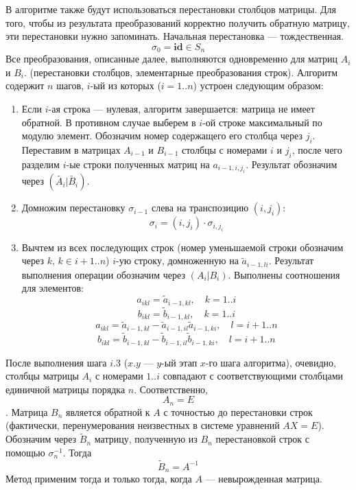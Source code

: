 \documentclass[12pt, russian]{article}
\begin{document}
В алгоритме также будут использоваться перестановки столбцов матрицы. Для того, чтобы из результата преобразований корректно получить обратную матрицу, эти перестановки нужно запоминать. Начальная перестановка --- тождественная.
$$ \sigma_0 = \textbf{id} \in S_n $$
Все преобразования, описанные далее, выполняются одновременно для матриц $A_i$ и $B_i$. (перестановки столбцов, элементарные преобразования строк).
Алгоритм содержит $n$ шагов, $i$-ый из которых ($i=1..n$) устроен следующим образом:
\begin{enumerate}

\item Если $i$-ая строка --- нулевая, алгоритм завершается: матрица не имеет обратной. В противном случае выберем в $i$-ой строке максимальный по модулю элемент. Обозначим номер содержащего его столбца через $j_i$. Переставим в матрицах $A_{i-1}$ и $B_{i-1}$ столбцы с номерами $i$ и $j_i$, после чего разделим $i$-ые строки полученных матриц на $a_{i-1,i,j_i}$. Результат обозначим через $(\tilde{A_i}|\tilde{B_i})$.

\item Домножим перестановку $\sigma_{i-1}$ слева на транспозицию $(i,j_i)$:
$$ \sigma_i = (i,j_i) \cdot \sigma_{i,j_i} $$

\item Вычтем из всех последующих строк (номер уменьшаемой строки обозначим через $k,\,k\in i+1..n$) $i$-ую строку, домноженную на $\tilde{a}_{i-1,li}$. Результат выполнения операции обозначим через $(A_i|B_i)$. Выполнены соотношения для элементов:
\pagebreak
$$ a_{ikl} = \tilde{a}_{i-1,kl},\quad k=1..i $$
$$ b_{ikl} = \tilde{b}_{i-1,kl},\quad k=1..i $$
$$ a_{ikl} = \tilde{a}_{i-1,kl} - \tilde{a}_{i-1,il}\tilde{a}_{i-1,ki},\quad l=i+1..n $$
$$ b_{ikl} = \tilde{b}_{i-1,kl} - \tilde{b}_{i-1,il}\tilde{b}_{i-1,ki},\quad l=i+1..n $$

\end{enumerate}

После выполнения шага $i.3$ ($x.y$ --- $y$-ый этап $x$-го шага алгоритма), очевидно, столбцы матрицы $A_i$ с номерами $1..i$ совпадают с соответствующими столбцами единичной матрицы порядка $n$. Соответственно, $$A_n = E$$. Матрица $B_n$ является обратной к $A$ с точностью до перестановки строк (фактически, перенумерования неизвестных в системе уравнений $AX=E$). Обозначим через $\tilde{B}_n$ матрицу, полученную из $B_n$ перестановкой строк с помощью $\sigma_n^{-1}$. Тогда
$$ \tilde{B}_n = A^{-1} $$
Метод применим тогда и только тогда, когда $A$ --- невырожденная матрица.
\end{document}

